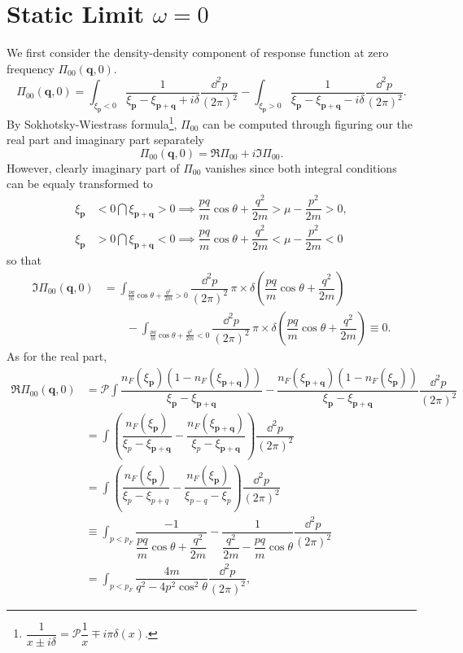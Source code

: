 \documentclass[bachelor,english,numbers]{ustcthesis}
\begin{document}
	\section{Static Limit $\omega=0$}
		\indent\par
		We first consider the density-density component of response function at zero frequency $\Pi_{00}(\bm{q},0)$.
		\begin{equation}\label{3.2.2}
			\Pi_{00}(\bm{q},0)=\int_{\xi_{\bm{p}}<0}\dfrac{1}{\xi_{\bm{p}}-\xi_{\bm{p+q}}+i\delta}\dfrac{\dd^2p}{(2\pi)^2}-\int_{\xi_{\bm{p}}>0}\dfrac{1}{\xi_{\bm{p}}-\xi_{\bm{p+q}}-i\delta}\dfrac{\dd^2p}{(2\pi)^2}.
		\end{equation}
		By Sokhotsky-Wiestrass formula\footnote{$\dfrac{1}{x\pm i\delta}=\mathcal{P}\dfrac{1}{x}\mp i\pi\delta(x)$.}, $\Pi_{00}$ can be computed through figuring our the real part and imaginary part separately
		\begin{equation*}
			\Pi_{00}(\bm{q},0)=\Re \Pi_{00}+i\Im \Pi_{00}.
		\end{equation*}
		However, clearly imaginary part of $\Pi_{00}$ vanishes since both integral conditions can be equaly transformed to
		\begin{align*}
			\xi_{\bm{p}}&<0\bigcap\xi_{\bm{p+q}}>0\implies\dfrac{pq}{m}\cos\theta+\dfrac{q^2}{2m}>\mu-\dfrac{p^2}{2m}>0,\\
			\xi_{\bm{p}}&>0\bigcap\xi_{\bm{p+q}}<0\implies\dfrac{pq}{m}\cos\theta+\dfrac{q^2}{2m}<\mu-\dfrac{p^2}{2m}<0
		\end{align*}
		so that
		\begin{align*}
			\Im \Pi_{00}(\bm{q},0)&=\int_{\frac{pq}{m}\cos\theta+\frac{q^2}{2m}>0}\dfrac{\dd^2p}{(2\pi)^2}\,\pi\times\delta\left(\dfrac{pq}{m}\cos\theta+\dfrac{q^2}{2m}\right)\nonumber\\
			&\qquad-\int_{\frac{pq}{m}\cos\theta+\frac{q^2}{2m}<0}\dfrac{\dd^2p}{(2\pi)^2}\,\pi\times\delta\left(\dfrac{pq}{m}\cos\theta+\dfrac{q^2}{2m}\right)\equiv 0.
		\end{align*}
		As for the real part,
		\begin{align*}
			\Re \Pi_{00}(\bm{q},0)&=\mathcal{P}\int\dfrac{n_F(\xi_{\bm{p}})(1-n_F(\xi_{\bm{p+q}}))}{\xi_{\bm{p}}-\xi_{\bm{p+q}}}-\dfrac{n_F(\xi_{\bm{p+q}})(1-n_F(\xi_{\bm{p}}))}{\xi_{\bm{p}}-\xi_{\bm{p+q}}}\dfrac{\dd^2 p}{(2\pi)^2}\\
			&=\int\left(\dfrac{n_F(\xi_{\bm{p}})}{\xi_{p}-\xi_{\bm{p+q}}}-\dfrac{n_F(\xi_{\bm{p+q}})}{\xi_{p}-\xi_{\bm{p+q}}}\right)\dfrac{\dd^2 p}{(2\pi)^2}\\
			&=\int\left(\dfrac{n_F(\xi_{\bm{p}})}{\xi_{p}-\xi_{p+q}}-\dfrac{n_F(\xi_{\bm{p}})}{\xi_{p-q}-\xi_{p}}\right)\dfrac{\dd^2 p}{(2\pi)^2}\\
			&\equiv\int_{p<p_F}\dfrac{-1}{\dfrac{pq}{m}\cos\theta+\dfrac{q^2}{2m}}-\dfrac{1}{\dfrac{q^2}{2m}-\dfrac{pq}{m}\cos\theta}\dfrac{\dd^2p}{(2\pi)^2}\\
			&=\int_{p<p_F}\dfrac{4m}{q^2-4p^2\cos^2\theta}\dfrac{\dd^2 p}{(2\pi)^2},
		\end{align*}
\end{document}
